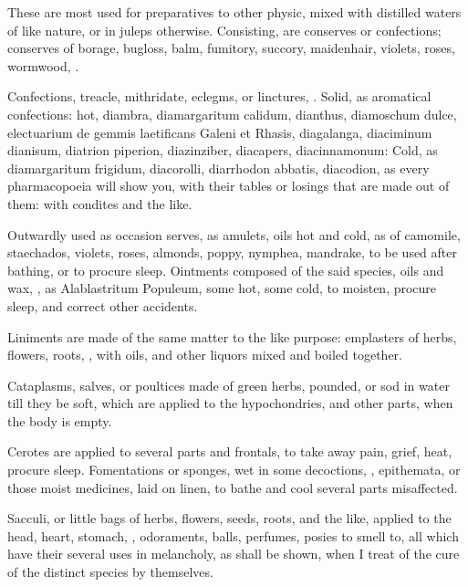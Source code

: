 {These are most used for preparatives to other physic, mixed with
distilled waters of like nature, or in juleps otherwise.
Consisting, are conserves or confections; conserves of borage, bugloss,
balm, fumitory, succory, maidenhair, violets, roses, wormwood, \etc{}.

Confections, treacle, mithridate, eclegms, or linctures, \etc{}. Solid, as
aromatical confections: hot, diambra, diamargaritum calidum, dianthus,
diamoschum dulce, electuarium de gemmis laetificans Galeni et Rhasis,
diagalanga, diaciminum dianisum, diatrion piperion, diazinziber,
diacapers, diacinnamonum: Cold, as diamargaritum frigidum, diacorolli,
diarrhodon abbatis, diacodion, \etc{} as every pharmacopoeia will show
you, with their tables or losings that are made out of them: with
condites and the like.

Outwardly used as occasion serves, as amulets, oils hot and cold, as of
camomile, staechados, violets, roses, almonds, poppy, nymphea,
mandrake, \etc{} to be used after bathing, or to procure sleep.
Ointments composed of the said species, oils and wax, \etc{}, as
Alablastritum Populeum, some hot, some cold, to moisten, procure sleep,
and correct other accidents.

Liniments are made of the same matter to the like purpose: emplasters
of herbs, flowers, roots, \etc{}, with oils, and other liquors mixed and
boiled together.

Cataplasms, salves, or poultices made of green herbs, pounded, or sod
in water till they be soft, which are applied to the hypochondries, and
other parts, when the body is empty.

Cerotes are applied to several parts and frontals, to take away pain,
grief, heat, procure sleep. Fomentations or sponges, wet in some
decoctions, \etc{}, epithemata, or those moist medicines, laid on linen,
to bathe and cool several parts misaffected.

Sacculi, or little bags of herbs, flowers, seeds, roots, and the like,
applied to the head, heart, stomach, \etc{}, odoraments, balls, perfumes,
posies to smell to, all which have their several uses in melancholy, as
shall be shown, when I treat of the cure of the distinct species by
themselves.


}
